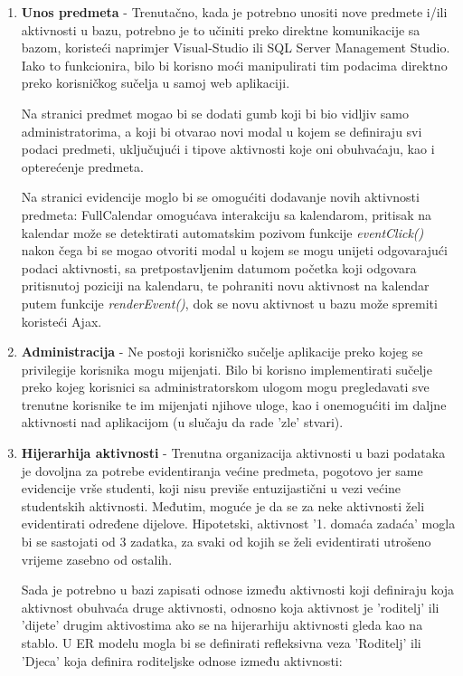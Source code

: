 \documentclass[times, utf8, zavrsni]{fer}
\begin{document}
\begin{enumerate}[leftmargin=*]
\item \textbf{Unos predmeta} - 
Trenutačno, kada je potrebno unositi nove predmete i/ili aktivnosti u bazu, potrebno je to učiniti preko direktne komunikacije sa bazom, koristeći naprimjer Visual-Studio ili SQL Server Management Studio. Iako to funkcionira, bilo bi korisno moći manipulirati tim podacima direktno preko korisničkog sučelja u samoj web aplikaciji. 

Na stranici predmet mogao bi se dodati gumb koji bi bio vidljiv samo administratorima, a koji bi otvarao novi modal u kojem se definiraju svi podaci predmeti, uključujući i tipove aktivnosti koje oni obuhvaćaju, kao i opterećenje predmeta.

Na stranici evidencije moglo bi se omogućiti dodavanje novih aktivnosti predmeta: FullCalendar omogućava interakciju sa kalendarom, pritisak na kalendar može se detektirati automatskim pozivom funkcije \emph{eventClick()} nakon čega bi se mogao otvoriti modal u kojem se mogu unijeti odgovarajući podaci aktivnosti, sa pretpostavljenim datumom početka koji odgovara pritisnutoj poziciji na kalendaru, te pohraniti novu aktivnost na kalendar putem funkcije \emph{renderEvent()}, dok se novu aktivnost u bazu može spremiti koristeći Ajax.

\item \textbf{Administracija} - 
Ne postoji korisničko sučelje aplikacije preko kojeg se privilegije korisnika mogu mijenjati. Bilo bi korisno implementirati sučelje preko kojeg korisnici sa administratorskom ulogom mogu pregledavati sve trenutne korisnike te im mijenjati njihove uloge, kao i onemogućiti im daljne aktivnosti nad aplikacijom (u slučaju da rade 'zle' stvari).

\item \textbf{Hijerarhija aktivnosti} - 
Trenutna organizacija aktivnosti u bazi podataka je dovoljna za potrebe evidentiranja većine predmeta, pogotovo jer same evidencije vrše studenti, koji nisu previše entuzijastični u vezi većine studentskih aktivnosti. Međutim, moguće je da se za neke aktivnosti želi evidentirati određene dijelove. Hipotetski, aktivnost '1. domaća zadaća' mogla bi se sastojati od 3 zadatka, za svaki od kojih se želi evidentirati utrošeno vrijeme zasebno od ostalih.

Sada je potrebno u bazi zapisati odnose između aktivnosti koji definiraju koja aktivnost obuhvaća druge aktivnosti, odnosno koja aktivnost je 'roditelj' ili 'dijete' drugim aktivostima ako se na hijerarhiju aktivnosti gleda kao na stablo. U ER modelu mogla bi se definirati refleksivna veza 'Roditelj' ili 'Djeca' koja definira roditeljske odnose između aktivnosti:


\end{enumerate}
\end{document}
